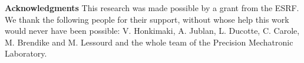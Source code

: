 \textbf{Acknowledgments}
This research was made possible by a grant from the ESRF.
We thank the following people for their support, without whose help this work would never have been possible: V. Honkimaki, A. Jublan, L. Ducotte, C. Carole, M. Brendike and M. Lessourd and the whole team of the Precision Mechatronic Laboratory.

